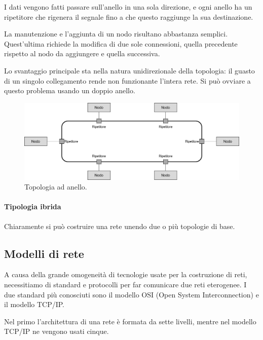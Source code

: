             I dati vengono fatti passare sull'anello in una sola direzione, e ogni anello ha un ripetitore che rigenera il segnale fino a che questo raggiunge la sua destinazione.
            
            La manutenzione e l'aggiunta di un nodo risultano abbastanza semplici. Quest'ultima richiede la modifica di due sole connessioni, quella precedente rispetto al nodo da aggiungere e quella successiva.
            
            Lo svantaggio principale sta nella natura unidirezionale della topologia: il guasto di un singolo collegamento rende non funzionante l'intera rete. Si può ovviare a questo problema usando un doppio anello.
            
            \begin{figure}[h]
                \centering
                \includegraphics[width=1\textwidth]{img/anello.png}
                \caption{Topologia ad anello.}
                \label{fig:img1}
            \end{figure}
            
            \newpage
            \paragraph{Tipologia ibrida} Chiaramente si può costruire una rete unendo due o più topologie di base.
            
    \subsection{Modelli di rete}
        A causa della grande omogeneità di tecnologie usate per la costruzione di reti, necessitiamo di standard e protocolli per far comunicare due reti eterogenee. I due standard più conosciuti sono il modello OSI (Open System Interconnection) e il modello TCP/IP.
            
        Nel primo l'architettura di una rete è formata da sette livelli, mentre nel modello TCP/IP ne vengono usati cinque.
            
